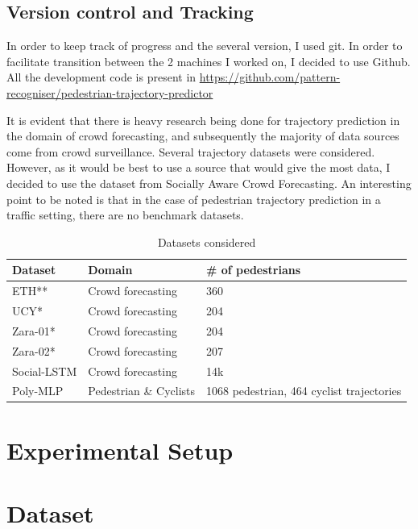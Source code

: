\subsection{Version control and Tracking}
In order to keep track of progress and the several version, I used git. In order to facilitate transition between the 2 machines I worked on, I decided to use Github. All the development code is present in \url{https://github.com/pattern-recogniser/pedestrian-trajectory-predictor}


It is evident that there is heavy research being done for trajectory prediction in the domain of crowd forecasting, and subsequently the majority of data sources come from crowd surveillance. 
Several trajectory datasets were considered. However, as it would be best to use a source that would give the most data, I decided to use the dataset from Socially Aware Crowd Forecasting. 
An interesting point to be noted is that in the case of pedestrian trajectory prediction in a traffic setting, there are no benchmark datasets.
\begin{table}[]
\begin{tabular}{|l|l|l|}
\hline
Dataset     & Domain            & \# of pedestrians \\
\hline
ETH**       & Crowd forecasting      & 360          \\
\hline
UCY*        & Crowd forecasting      & 204          \\
\hline
Zara-01*    & Crowd forecasting      & 204          \\
\hline
Zara-02*    & Crowd forecasting      & 207          \\
\hline
Social-LSTM & Crowd forecasting      & 14k          \\
\hline
Poly-MLP    & Pedestrian \& Cyclists & 1068 pedestrian, 464 cyclist trajectories\\
\hline
\end{tabular}
\caption{Datasets considered}
\label{table:dataset_considered}

\end{table}
\section{Experimental Setup}
\section{Dataset}

